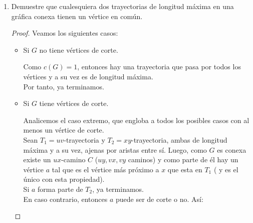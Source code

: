 \documentclass{article}
\begin{document}
\begin{enumerate}
\begin{proof}
        Sea $G$ una gráfica completa, entonces $P_{3}$ es subgráfica de $G$. Para este
        ejercicio necesitamos de una condición, $V_G \ge 3$, para las gráficas que no
        cumplan esto se tendrá la demostración por vacuidad.

        Tomemos a $x_{i - 1}, x_{i}, x_{i + 1}$ en $V_{G}$ ($2 \ge i \ge
        |V_{G}| - 1$), como $G$ es completa se tiene que la distancia entre cualesquiera
        $2$ v\'ertices es $1$, luego tenemos que hay ${3 \choose 2}$ aristas!! y esto es
        claramente mayor que $2$ ($|E_{P_3}|$), como los v\'ertices que tomamos son arbitrarios,
        podemos concluir que $P_{3} \nsubseteq G$.

        Como la anterior contradicci\'on resulta de suponer a $G$ completa, podemos
        asegurar que si $G$ no es completa, entonces $P_3 \subseteq G$.
      \end{proof}

    \item Demuestre que cualesquiera dos trayectorias de longitud m\'axima en una
      gr\'afica conexa tienen un vértice en común.

      \begin{proof}
        Veamos los siguientes casos:

        \begin{itemize}
          \item Si $G$ no tiene vértices de corte.

            Como $c(G) = 1$, entonces hay una trayectoria que pasa por todos los vértices
            y a su vez es de longitud máxima. \\
            Por tanto, ya terminamos.

          \item Si $G$ tiene vértices de corte.

            Analicemos el caso extremo, que engloba a todos los posibles casos con al menos
            un vértice de corte. \\
            Sean $T_{1} = uv$-trayectoria y $T_{2} = xy$-trayectoria, ambas de longitud
            máxima y a su vez, ajenas por aristas entre sí. Luego, como $G$ es conexa existe
            un $ux$-camino $C$ ($uy, vx, vy$ caminos) y como parte de él hay un vértice $a$
            tal que es el vértice más próximo a $x$ que esta en $T_{1}$ ( y es el único con esta
            propiedad). \\
            Si $a$ forma parte de $T_{2}$, ya terminamos. \\
            En caso contrario, entonces $a$ puede ser de corte o no. Así:


\end{itemize}
\end{proof}
\end{enumerate}
\end{document}
